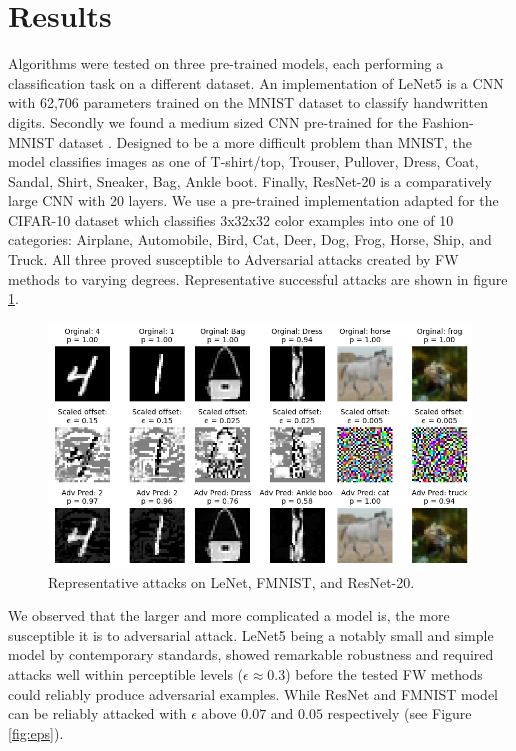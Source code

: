 \documentclass{article}
\begin{document}
\section{Results}
Algorithms were tested on three pre-trained models, each performing a classification task on a different dataset. An implementation of LeNet5 \cite{lenet, lenet-mdl} is a CNN with 62,706 parameters trained on the MNIST dataset to classify handwritten digits. 
Secondly we found a medium sized CNN pre-trained for the Fashion-MNIST dataset \cite{fmnist, fmnist-mdl}. Designed to be a more difficult problem than MNIST, the model classifies images as one of T-shirt/top, Trouser, Pullover, Dress, Coat, Sandal, Shirt, Sneaker, Bag, Ankle boot. 
Finally, ResNet-20 \cite{resnet} is a comparatively large CNN with 20 layers. We use a pre-trained implementation adapted for the CIFAR-10 dataset \cite{cifar10} which classifies 3x32x32 color examples into one of 10 categories: Airplane, Automobile, Bird, Cat, Deer, Dog, Frog, Horse, Ship, and Truck. All three proved susceptible to Adversarial attacks created by FW methods to varying degrees. Representative successful attacks are shown in figure \ref{fig:adv_ex}.

\begin{figure}[H]
    \centering
    \includegraphics[width=\textwidth]{plots/adv_ex.png}
    \caption{Representative attacks on LeNet, FMNIST, and ResNet-20.}
    \label{fig:adv_ex}
\end{figure}

We observed that the larger and more complicated a model is, the more susceptible it is to adversarial attack. 
LeNet5 being a notably small and simple model by contemporary standards, showed remarkable robustness and required attacks well within perceptible levels ($\epsilon \approx 0.3$) before the tested FW methods could reliably produce adversarial examples. While ResNet and FMNIST model can be reliably attacked with $\epsilon$ above $0.07$ and $0.05$ respectively (see Figure \ref{fig:eps}).
\end{document}
